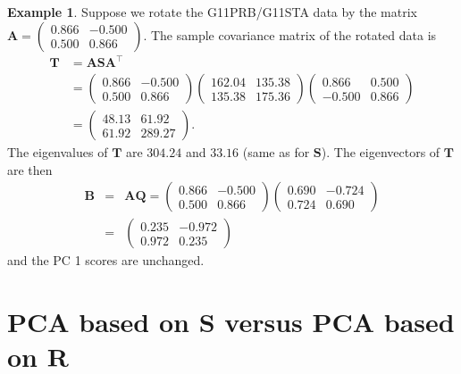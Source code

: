 \documentclass[]{book}
\theoremstyle{definition}
\theoremstyle{definition}
\newtheorem{example}{Example}[chapter]
\theoremstyle{definition}
\theoremstyle{remark}
\begin{document}
\begin{example}
\protect\hypertarget{exm:unnamed-chunk-14}{}{\label{exm:unnamed-chunk-14} }Suppose we rotate the G11PRB/G11STA data by the matrix \(\boldsymbol A= \begin{pmatrix} 0.866 & -0.500 \\ 0.500 & 0.866 \end{pmatrix}\). The sample covariance matrix of the rotated data is
\begin{align*}
\boldsymbol T&= \boldsymbol A\boldsymbol S\boldsymbol A^\top\\
&= \begin{pmatrix} 0.866 & -0.500 \\ 0.500 & 0.866 \end{pmatrix}
\begin{pmatrix} 162.04 & 135.38 \\ 135.38 & 175.36 \end{pmatrix}
\begin{pmatrix} 0.866 & 0.500 \\ -0.500 & 0.866 \end{pmatrix} \\
&= \begin{pmatrix} 48.13 & 61.92 \\ 61.92 & 289.27 \end{pmatrix}.
\end{align*}
The eigenvalues of \(\boldsymbol T\) are \(304.24\) and \(33.16\) (same as for \(\boldsymbol S\)). The eigenvectors of \(\boldsymbol T\) are then
\begin{eqnarray*}
\boldsymbol B&=& \boldsymbol A\boldsymbol Q= \begin{pmatrix} 0.866 & -0.500 \\ 0.500 & 0.866 \end{pmatrix} \begin{pmatrix} 0.690 & -0.724 \\ 0.724 & 0.690 \end{pmatrix} \\
&=& \begin{pmatrix} 0.235 & -0.972 \\ 0.972 & 0.235 \end{pmatrix}
\end{eqnarray*}
and the PC 1 scores are unchanged.
\end{example}

\hypertarget{pca-based-on-boldsymbol-s-versus-pca-based-on-boldsymbol-r}{%
\section{\texorpdfstring{PCA based on \(\boldsymbol S\) versus PCA based on \(\boldsymbol R\)}{PCA based on \textbackslash{}boldsymbol S versus PCA based on \textbackslash{}boldsymbol R}}\label{pca-based-on-boldsymbol-s-versus-pca-based-on-boldsymbol-r}}
\end{document}
